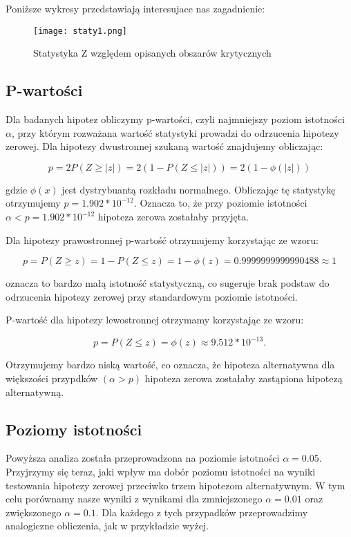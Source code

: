 \documentclass[12pt,letterpaper]{article}
\theoremstyle{definition}
\begin{document}
Poniższe wykresy przedstawiają interesujace nas zagadnienie:
\begin{figure}[H]
			\centering

				\centering
				\texttt{[image: staty1.png]}
				\caption{Statystyka Z względem opisanych obszarów krytycznych}
				\label{fig:zdjecie1}
			\hfill
		\end{figure}

\subsection{P-wartości}
Dla badanych hipotez obliczymy p-wartości, czyli najmniejszy poziom istotności \(\alpha\), przy którym rozważana wartość statystyki prowadzi do odrzucenia hipotezy zerowej. Dla hipotezy dwustronnej szukaną wartość znajdujemy obliczając:

\[
p = 2P(Z \geq |z|) = 2(1 - P(Z \leq |z|)) = 2(1 - \phi(|z|))
\]

gdzie \(\phi(x)\) jest dystrybuantą rozkładu normalnego. Obliczając tę statystykę otrzymujemy \(p = 1.902 * 10^{-12}\). Oznacza to, że przy poziomie istotności \(\alpha < p = 1.902 * 10^{-12}\) hipoteza zerowa zostałaby przyjęta.

Dla hipotezy prawostronnej p-wartość otrzymujemy korzystając ze wzoru:

\[
p = P(Z \geq z) = 1 - P(Z \leq z) = 1 - \phi(z) = 0.9999999999990488 \approx 1
\]

oznacza to bardzo małą istotność statystyczną, co sugeruje brak podstaw do odrzucenia hipotezy zerowej przy standardowym poziomie istotności.

P-wartość dla hipotezy lewostronnej otrzymamy korzystając ze wzoru:

\[
p = P(Z \leq z) = \phi(z) \approx 9.512 * 10^{-13}.
\]

Otrzymujemy bardzo niską wartość, co oznacza, że hipoteza alternatywna dla większości przypdków \((\alpha > p)\) hipoteza zerowa zostałaby zastąpiona hipotezą alternatywną.

\subsection{Poziomy istotności}
Powyższa analiza została przeprowadzona na poziomie istotności \(\alpha = 0.05.\) Przyjrzymy się teraz, jaki wpływ ma dobór poziomu istotności na wyniki testowania hipotezy zerowej przeciwko trzem hipotezom alternatywnym. W tym celu porównamy nasze wyniki z wynikami dla zmniejszonego \(\alpha = 0.01\) oraz zwiększonego \(\alpha = 0.1\). Dla każdego z tych przypadków przeprowadzimy analogiczne obliczenia, jak w przykładzie wyżej.
\end{document}
